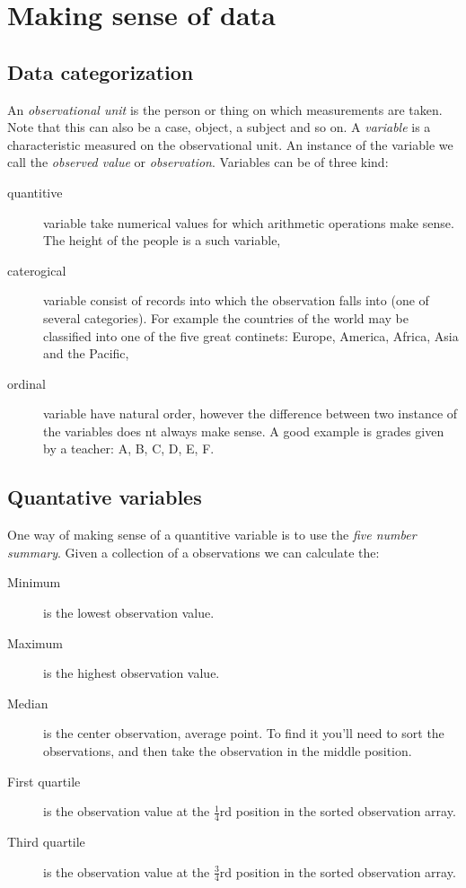 \chapter*{Making sense of data}
\setcounter{section}{0}
\renewcommand*{\theHsection}{ch1.\the\value{section}}

\section{Data categorization}

An \emph{observational unit} is the person or thing on which measurements are
taken. Note that this can also be a case, object, a subject and so on. A
\emph{variable} is a characteristic measured on the observational unit. An
instance of the variable we call the \emph{observed value} or
\emph{observation}. Variables can be of three kind:

\begin{description}
  \item[quantitive] variable take numerical values for which arithmetic
  operations make sense. The height of the people is a such variable,
  \item[caterogical] variable consist of records into which the observation
  falls into (one of several categories). For example the countries of the
  world may be classified into one of the five great continets: Europe, America,
  Africa, Asia and the Pacific,
  \item[ordinal] variable have natural order, however the difference between two
  instance of the variables does nt always make sense. A good example is grades
  given by a teacher: A, B, C, D, E, F.
   
\end{description}

\section{Quantative variables}

One way of making sense of a quantitive variable is to use the \emph{five
number summary}. Given a collection of a observations we can calculate the: 

\begin{description}
  \item[Minimum] is the lowest observation value.
  \item[Maximum] is the highest observation value.
  \item[Median] is the center observation, average point. To find it you'll need
  to sort the observations, and then take the observation in the middle
  position.
  \item[First quartile] is the observation value at the $\frac{1}{4}$rd position
  in the sorted observation array.
  \item[Third quartile] is the observation value at the $\frac{3}{4}$rd position
  in the sorted observation array.
\end{description}

